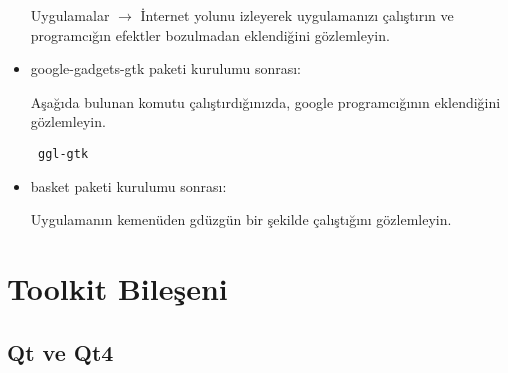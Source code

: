 \documentclass[a4paper,10pt]{article}
\begin{document}
\begin{itemize}
Uygulamalar $\rightarrow$ İnternet yolunu izleyerek uygulamanızı çalıştırın ve programcığın efektler bozulmadan eklendiğini gözlemleyin.

\item google-gadgets-gtk paketi kurulumu sonrası:

Aşağıda bulunan komutu çalıştırdığınızda, google programcığının eklendiğini gözlemleyin.
\begin{verbatim}
 ggl-gtk 
\end{verbatim}

\item basket paketi kurulumu sonrası:

Uygulamanın kemenüden gdüzgün bir şekilde çalıştığını gözlemleyin.

\end{itemize}

\section{Toolkit Bileşeni}
\subsection*{Qt ve Qt4}
\end{document}
